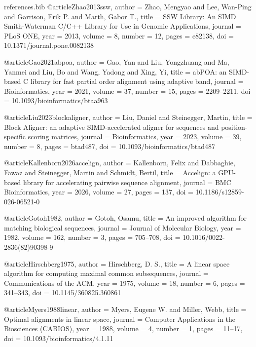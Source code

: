 \begin{filecontents*}[overwrite]{references.bib}
@article{Zhao2013ssw,
  author  = {Zhao, Mengyao and Lee, Wan-Ping and Garrison, Erik P. and Marth, Gabor T.},
  title   = {{SSW} Library: An {SIMD} {Smith-Waterman} {C/C++} Library for Use in Genomic Applications},
  journal = {PLoS ONE},
  year    = {2013},
  volume  = {8},
  number  = {12},
  pages   = {e82138},
  doi     = {10.1371/journal.pone.0082138}
}

@article{Gao2021abpoa,
  author  = {Gao, Yan and Liu, Yongzhuang and Ma, Yanmei and Liu, Bo and Wang, Yadong and Xing, Yi},
  title   = {{abPOA}: an {SIMD}-based {C} library for fast partial order alignment using adaptive band},
  journal = {Bioinformatics},
  year    = {2021},
  volume  = {37},
  number  = {15},
  pages   = {2209--2211},
  doi     = {10.1093/bioinformatics/btaa963}
}

@article{Liu2023blockaligner,
  author  = {Liu, Daniel and Steinegger, Martin},
  title   = {Block Aligner: an adaptive {SIMD}-accelerated aligner for sequences and position-specific scoring
             matrices},
  journal = {Bioinformatics},
  year    = {2023},
  volume  = {39},
  number  = {8},
  pages   = {btad487},
  doi     = {10.1093/bioinformatics/btad487}
}

@article{Kallenborn2026accelign,
  author  = {Kallenborn, Felix and Dabbaghie, Fawaz and Steinegger, Martin and Schmidt, Bertil},
  title   = {Accelign: a {GPU}-based library for accelerating pairwise sequence alignment},
  journal = {BMC Bioinformatics},
  year    = {2026},
  volume  = {27},
  pages   = {137},
  doi     = {10.1186/s12859-026-06521-0}
}

@article{Gotoh1982,
  author  = {Gotoh, Osamu},
  title   = {An improved algorithm for matching biological sequences},
  journal = {Journal of Molecular Biology},
  year    = {1982},
  volume  = {162},
  number  = {3},
  pages   = {705--708},
  doi     = {10.1016/0022-2836(82)90398-9}
}

@article{Hirschberg1975,
  author  = {Hirschberg, D. S.},
  title   = {A linear space algorithm for computing maximal common subsequences},
  journal = {Communications of the ACM},
  year    = {1975},
  volume  = {18},
  number  = {6},
  pages   = {341--343},
  doi     = {10.1145/360825.360861}
}

@article{Myers1988linear,
  author  = {Myers, Eugene W. and Miller, Webb},
  title   = {Optimal alignments in linear space},
  journal = {Computer Applications in the Biosciences (CABIOS)},
  year    = {1988},
  volume  = {4},
  number  = {1},
  pages   = {11--17},
  doi     = {10.1093/bioinformatics/4.1.11}
}


\end{filecontents*}
